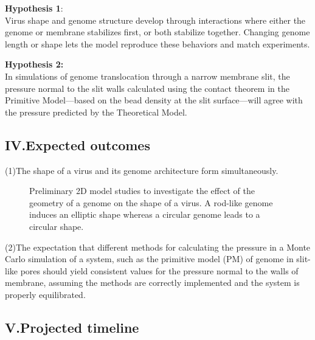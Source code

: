 \documentclass[12pt]{article}
\begin{document}
\begin{flushleft}
\noindent \textbf{Hypothesis 1}:\\
Virus shape and genome structure develop through interactions where either the genome or membrane stabilizes first, or both stabilize together. Changing genome length or shape lets the model reproduce these behaviors and match experiments.
	
\noindent \textbf{Hypothesis 2:}\\
In simulations of genome translocation through a narrow membrane slit, the pressure normal to the slit walls calculated using the contact theorem in the Primitive Model—based on the bead density at the slit surface—will agree with the pressure predicted by the Theoretical Model.

\subsection*{IV.Expected outcomes} 
(1)The shape of a virus and its genome architecture form simultaneously.
	
\begin{figure}[!ht]
  \centering
  \caption{Preliminary 2D model studies to
investigate the effect of the geometry of a
genome on the shape of a virus. A rod-like
genome induces an elliptic shape whereas a
circular genome leads to a circular shape\cite{goldsmith2003monkeypox}.}
\end{figure}

(2)The expectation that different methods for calculating the pressure in a Monte Carlo simulation of a system, such as the primitive model (PM) of genome in slit-like pores should yield consistent values for the pressure normal to the walls of membrane, assuming the methods are correctly implemented and the system is properly equilibrated.

\subsection*{V.Projected timeline}


\end{flushleft}
\end{document}
